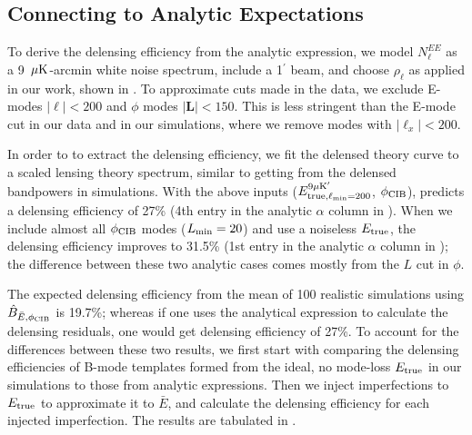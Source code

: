 \subsection{Connecting to Analytic Expectations}
To derive the delensing efficiency from the analytic expression, we model $N_{\ell}^{EE}$ as a 9~$\mu {\rm K}$-arcmin white noise spectrum, include a 1$^{\prime}$ beam, and choose $\rho_{\ell}$ as applied in our work, shown in .
To approximate cuts made in the data, we exclude E-modes $|\pmb{\ell}| < 200$ and $\phi$ modes $|\pmb{L}| < 150$.
This is less stringent than the E-mode cut in our data and in our simulations, where we remove modes with $|\ell_x| < 200$.

In order to to extract the delensing efficiency, we fit the delensed theory curve to a scaled lensing theory spectrum, similar to getting \Ares from the delensed bandpowers in simulations.
With the above inputs ($E^{9\mu {\rm K}^{\prime}}_{\rm true, \ell_{min} = 200}$, $\phi_{\rm CIB}$),  predicts a delensing efficiency of 27\% (4th entry in the analytic $\alpha$ column in ).
When we include almost all $\phi_{\rm CIB}$ modes ($L_{\rm min} = 20$) and use a noiseless $E_{\rm true}$, the delensing efficiency improves to 31.5\%  (1st entry in the analytic $\alpha$ column in );
the difference between these two analytic cases comes mostly from the $L$ cut in $\phi$.

The expected delensing efficiency from the mean of 100 realistic simulations using $\hat{B}_{\bar{E}, \phi_{\rm CIB}}$ is 19.7\%;
whereas if one uses the analytical expression to calculate the delensing residuals, one would get delensing efficiency of 27\%.
To account for the differences between these two results, we first start with comparing the delensing efficiencies of B-mode templates formed from
the ideal, no mode-loss $E_{\rm true}$ in our simulations to those from analytic expressions.
Then we inject imperfections to $E_{\rm true}$ to approximate it to $\bar{E}$, and calculate the delensing efficiency
for each injected imperfection.
The results are tabulated in .

